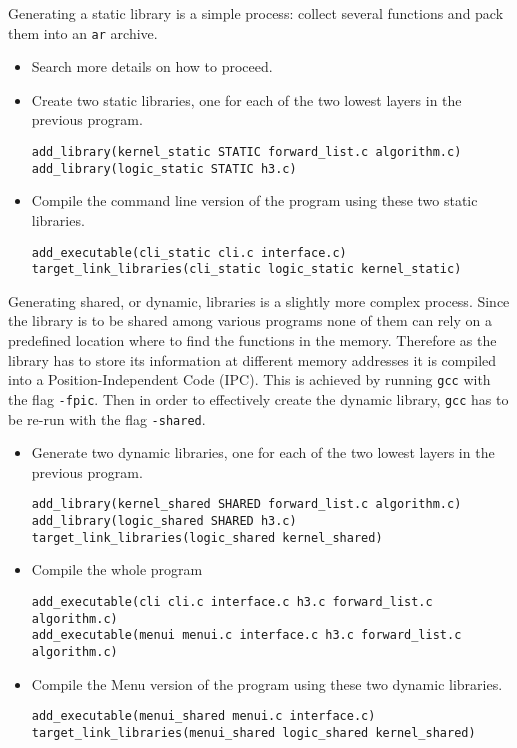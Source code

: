 \documentclass[a4paper]{article}
\begin{document}
Generating a static library is a simple process: collect several functions and pack them into an \texttt{ar} archive.
\begin{itemize}
    \item Search more details on how to proceed.
    \item Create two static libraries, one for each of the two lowest layers in the previous program.
    \begin{verbatim}
add_library(kernel_static STATIC forward_list.c algorithm.c)
add_library(logic_static STATIC h3.c)
    \end{verbatim}
    \item Compile the command line version of the program using these two static libraries.
    \begin{verbatim}
add_executable(cli_static cli.c interface.c)
target_link_libraries(cli_static logic_static kernel_static)
    \end{verbatim}
\end{itemize}
Generating shared, or dynamic, libraries is a slightly more complex process. Since the library is to be shared among various programs none of them can rely on a predefined location where to find the functions in the memory. Therefore as the library has to store its information at different memory addresses it is compiled into a Position-Independent Code (IPC). This is achieved by running \texttt{gcc} with the flag \texttt{-fpic}. Then in order to effectively create the dynamic library, \texttt{gcc} has to be re-run with the flag \texttt{-shared}.
\begin{itemize}
    \item Generate two dynamic libraries, one for each of the two lowest layers in the previous program.
    \begin{verbatim}
add_library(kernel_shared SHARED forward_list.c algorithm.c)
add_library(logic_shared SHARED h3.c)
target_link_libraries(logic_shared kernel_shared)
    \end{verbatim}
    \item Compile the whole program
    \begin{verbatim}
add_executable(cli cli.c interface.c h3.c forward_list.c algorithm.c)
add_executable(menui menui.c interface.c h3.c forward_list.c algorithm.c)
    \end{verbatim}
    \item Compile the Menu version of the program using these two dynamic libraries.
    \begin{verbatim}
add_executable(menui_shared menui.c interface.c)
target_link_libraries(menui_shared logic_shared kernel_shared)
    \end{verbatim}
\end{itemize}
\end{document}
